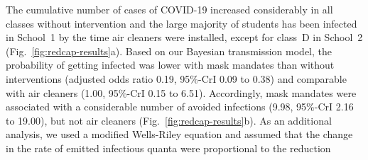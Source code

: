 \documentclass[fleqn,11pt]{wlscirep}
\begin{document}
The cumulative number of cases of COVID-19 increased considerably in all classes without intervention and the large majority of students has been infected in School~1 by the time air cleaners were installed, except for class~D in School~2 (Fig.~\ref{fig:redcap-results}a).  Based on our Bayesian transmission model, the probability of getting infected was lower with mask mandates than without interventions (adjusted odds ratio 0.19, 95\%-CrI 0.09 to 0.38) and comparable with air cleaners (1.00, 95\%-CrI 0.15 to 6.51). Accordingly, mask mandates were associated with a considerable number of avoided infections (9.98, 95\%-CrI 2.16 to 19.00), but not air cleaners (Fig.~\ref{fig:redcap-results}b). As an additional analysis, we used a modified Wells-Riley equation\cite{Rudnick2003} and assumed that the change in the rate of emitted infectious quanta were proportional to the  reduction 
\end{document}
